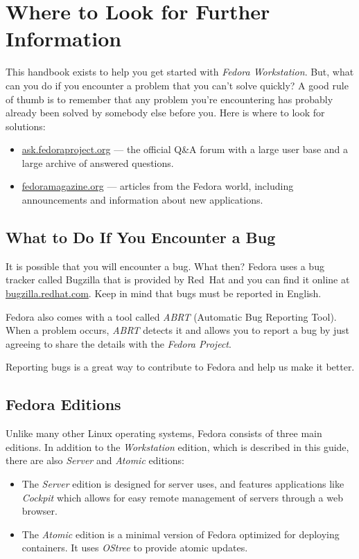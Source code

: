 \chapter*{Where to Look for Further Information}

This handbook exists to help you get started with \emph{Fedora Workstation}. But, what can you do if you encounter a problem that you can't solve quickly? A good rule of thumb is to remember that any problem you're encountering has probably already been solved by somebody else before you. Here is where to look for solutions:
\begin{itemize}
\item\url{ask.fedoraproject.org} --- the official Q\&A forum with a large user base and a large archive of answered questions.

\item\url{fedoramagazine.org} --- articles from the Fedora world, including announcements and information about new applications.
\end{itemize}

\section*{What to Do If You Encounter a Bug}

It is possible that you will encounter a bug. What then? Fedora uses a bug tracker called Bugzilla that is provided by Red~Hat and you can find it online at \url{bugzilla.redhat.com}. Keep in mind that bugs must be reported in English.

Fedora also comes with a tool called \emph{ABRT} (Automatic Bug Reporting Tool). When a problem occurs, \emph{ABRT} detects it and allows you to report a bug by just agreeing to share the details with the \emph{Fedora Project}.

Reporting bugs is a great way to contribute to Fedora and help us make it better.

\section*{Fedora Editions}

Unlike many other Linux operating systems, Fedora consists of three main editions. In addition to the \emph{Workstation} edition, which is described in this guide, there are also \emph{Server} and \emph{Atomic} editions:
\begin{itemize}
\item The \emph{Server} edition is designed for server uses, and features applications like \emph{Cockpit} which allows for easy remote management of servers through a web browser.

\item The \emph{Atomic} edition is a minimal version of Fedora optimized for deploying containers. It uses \emph{OStree} to provide atomic updates.
\end{itemize}

